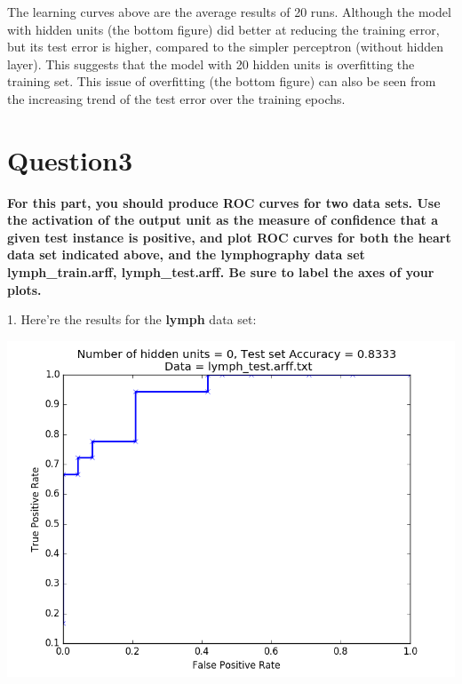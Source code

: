 \documentclass[paper=a4, fontsize=11pt]{scrartcl} %
\numberwithin{equation}{section} %
\numberwithin{figure}{section} %
\numberwithin{table}{section} %
\begin{document}
The learning curves above are the average results of 20 runs. Although the model with hidden units (the bottom figure) did better at reducing the training error, but its test error is higher, compared to the simpler perceptron (without hidden layer). This suggests that the model with 20 hidden units is overfitting the training set. This issue of overfitting (the bottom figure) can also be seen from the increasing trend of the test error over the training epochs. 


\newpage
\section*{Question3}
\textbf{For this part, you should produce ROC curves for two data sets. Use the activation of the output unit as the measure of confidence that a given test instance is positive, and plot ROC curves for both the heart data set indicated above, and the lymphography data set lymph\_train.arff, lymph\_test.arff. Be sure to label the axes of your plots.\\}

1. Here're the results for the \textbf{lymph} data set: 
\begin{center}
\includegraphics[scale=.45]{pics/roc_noHidden.png}
\end{center}
\end{document}
